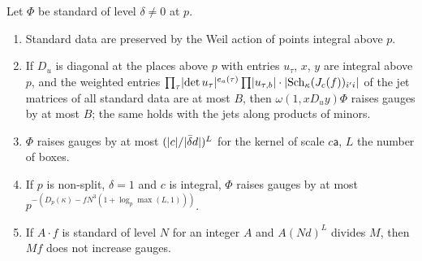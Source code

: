 \begin{theorem}\label{thm:one-lift-gauge}
Let $\Phi$ be standard of level $\delta\ne0$ at $p$.
\begin{enumerate}[label=\textup{(\alph*)}]
\item Standard data are preserved by the Weil action of points integral above $p$.
\item If $D_u$ is diagonal at the places above $p$ with entries $u_\tau$, $x$, $y$ are integral above $p$, and the weighted entries
$\prod_\tau\lvert \det u_\tau\rvert^{e_a(\tau)}\prod\lvert u_{\tau,b}\rvert\cdot\lvert \mathrm{Sch}_\kappa(J_c(f))_{i'i}\rvert$ of the jet matrices of all standard
data are at most $B$, then $\omega(1,xD_uy)\Phi$ raises gauges by at most $B$; the same holds with the jets along products of minors.
\item $\Phi$ raises gauges by at most $(\lvert c\rvert/\lvert \bar\delta d\rvert)^{L}$ for the kernel of scale $c\mathsf a$, $L$ the number of boxes.
\item If $p$ is non-split, $\delta=1$ and $c$ is integral, $\Phi$ raises gauges by at most $p^{-(D_p(\kappa)-fN^3(1+\log_p\max(L,1)))}$.
\item If $A\cdot f$ is standard of level $N$ for an integer $A$ and $A(Nd)^L$ divides $M$, then $Mf$ does not increase gauges.
\end{enumerate}
\end{theorem}

